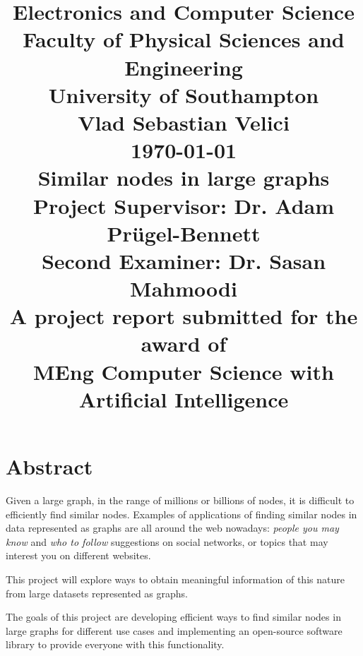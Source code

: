 \documentclass[12pt]{report}
\begin{document}
\title{ \normalsize Electronics and Computer Science\\
Faculty of Physical Sciences and Engineering\\
University of Southampton
        \\ [2.0cm]
        Vlad Sebastian Velici \\
        \today
        \\ [1.0cm]
        {\LARGE \textbf{Similar nodes in large graphs}}
        \\ [1.0cm]
        Project Supervisor: Dr. Adam Prügel-Bennett \\
Second Examiner: Dr. Sasan Mahmoodi
	\\ [2.0cm]
	A project report submitted for the award of \\
MEng Computer Science with Artificial Intelligence
        \normalsize \vspace*{5\baselineskip}}

\date{}

\maketitle
\tableofcontents
\newpage

\section*{Abstract}
Given a large graph, in the range of millions or billions of nodes, it is difficult
to efficiently find similar nodes. Examples of applications of finding similar
nodes in data represented as graphs are all around the web nowadays:
\textit{people you may know} and \textit{who to follow} suggestions on social
networks, or topics that may interest you on different websites.


This project will explore ways to obtain meaningful information of this nature
from large datasets represented as graphs.


The goals of this project are developing efficient ways to find similar nodes in
large graphs for different use cases and implementing an open-source software
library to provide everyone with this functionality.
\newpage
\end{document}
